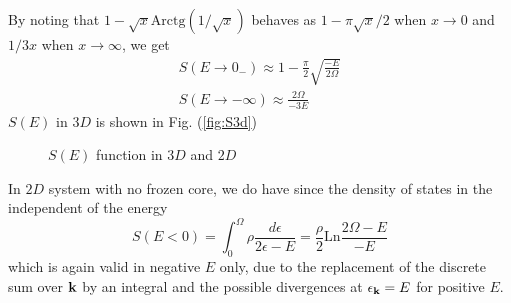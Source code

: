 \documentclass[11pt]{article} %
\begin{document}
By noting that $1-\sqrt{x}\text{Arctg}(1/\sqrt{x})$ behaves as $1-\pi\sqrt{x}/2$ when $x\to0$ and $1/3x$ when $x\to\infty$, we get 
\begin{gather}
S(E\to0_{-})\approx1-\frac{\pi}{2}\sqrt{\frac{-E}{2\Omega}}\\
S(E\to-\infty)\approx\frac{2\Omega}{-3E}
\end{gather}
$S(E)$ in $3D$ is shown in Fig. (\ref{fig:S3d})
\begin{figure}[hhtb]
	\centering
	         \quad
		\quad
		\caption{$S(E)$ function in $3D$ and $2D$\label{fig:narrowFR}}
\end{figure}
In $2D$ system with no frozen core, we do have since the density of states in the independent of the energy
\begin{equation}
S(E<0)=\int_{0}^{\Omega}\rho\frac{d\epsilon}{2\epsilon-E}=\frac{\rho}{2}\text{Ln}\frac{2\Omega-E}{-E}
\end{equation}
which is again valid in negative $E$ only, due to the replacement of the discrete sum over $\mathbf{k}$ by an integral and the possible divergences at $\epsilon_{\mathbf{k}}=E$ for positive $E$. 
\end{document}
